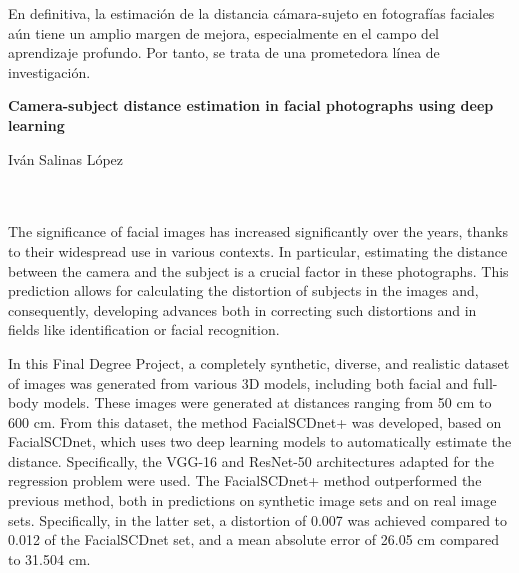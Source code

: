 En definitiva, la estimación de la distancia cámara-sujeto en fotografías faciales aún tiene un amplio margen de mejora, especialmente en el campo del aprendizaje profundo. Por tanto, se trata de una prometedora línea de investigación.
\cleardoublepage


\thispagestyle{empty}


\begin{center}
{\large\bfseries Camera-subject distance estimation in facial photographs using deep learning}\\
\end{center}
\begin{center}
Iván Salinas López\\
\end{center}

\\

\vspace{0.7cm}
\\

The significance of facial images has increased significantly over the years, thanks to their widespread use in various contexts. In particular, estimating the distance between the camera and the subject is a crucial factor in these photographs. This prediction allows for calculating the distortion of subjects in the images and, consequently, developing advances both in correcting such distortions and in fields like identification or facial recognition.

In this Final Degree Project, a completely synthetic, diverse, and realistic dataset of images was generated from various 3D models, including both facial and full-body models. These images were generated at distances ranging from 50 cm to 600 cm. From this dataset, the method FacialSCDnet+ was developed, based on FacialSCDnet, which uses two deep learning models to automatically estimate the distance. Specifically, the VGG-16 and ResNet-50 architectures adapted for the regression problem were used. The FacialSCDnet+ method outperformed the previous method, both in predictions on synthetic image sets and on real image sets. Specifically, in the latter set, a distortion of 0.007 was achieved compared to 0.012 of the FacialSCDnet set, and a mean absolute error of 26.05 cm compared to 31.504 cm.

